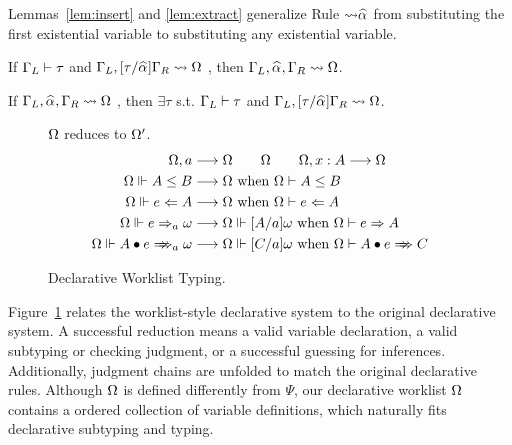 Lemmas~\ref{lem:insert} and \ref{lem:extract}
generalize Rule $\mathtt{{\sto}\al}$ from substituting the first existential variable
to substituting any existential variable.

\begin{lemma}[Insert]\label{lem:insert}
If $\Gamma_L\vdash \tau$ and $\Gm_L, [\tau/\al]\Gm_R \sto \Om$
, then $\Gm_L, \al, \Gm_R \sto \Om$.
\end{lemma}
\begin{lemma}[Extract]\label{lem:extract}
If $\Gm_L, \al, \Gm_R \sto \Om$
, then $\exists \tau$ s.t. $\Gamma_L\vdash\tau$ and $\Gm_L, [\tau/\al]\Gm_R \sto \Om$.
\end{lemma}

\begin{figure}[t]
 $\Omega$ reduces to $\Omega'$.
\begin{gather*}
\begin{aligned}
\Om,a &\rto \Om \qquad \Om \qquad \Om,x:A \rto \Om\\
\Om\Vdash A\le B &\rto \Om \text{ when } \Om\vdash A\le B\\
\Om\Vdash e\Lto A &\rto \Om \text{ when } \Om\vdash e\Lto A\\
\Om\Vdash e\To_a \jg &\rto \Om\Vdash[A/a]\jg \text{ when } \Om\vdash e\To A\\
\Om\Vdash \appInfAlg{A}{e} &\rto \Om\Vdash[C/a]\jg \text{ when } \Om\vdash \appInf{A}{e}{C}\\
\end{aligned}
\end{gather*}
\caption{Declarative Worklist Typing.}
\label{fig:decl:worklist}
\end{figure}

Figure~\ref{fig:decl:worklist} relates the worklist-style declarative system
to the original declarative system.
A successful reduction means a valid variable declaration,
a valid subtyping or checking judgment, or a successful guessing for inferences.
Additionally, judgment chains are unfolded to match the original declarative rules.
Although $\Omega$ is defined differently from $\Psi$,
our declarative worklist $\Omega$ contains a ordered collection of variable definitions,
which naturally fits declarative subtyping and typing.

